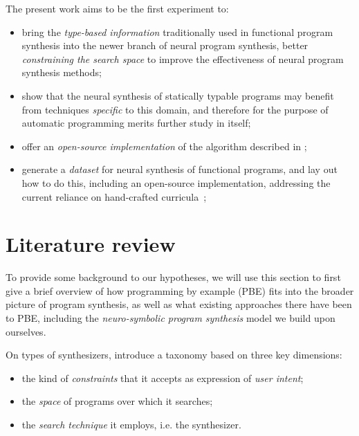\documentclass{article}
\begin{document}
The present work aims to be the first experiment to:
\begin{itemize}
    \item bring the \emph{type-based information} traditionally used in functional program synthesis into the newer branch of neural program synthesis,
    better \emph{constraining the search space} to improve the effectiveness of neural program synthesis methods;
    \item show that the neural synthesis of statically typable programs may benefit from techniques \emph{specific} to this domain, and therefore for the purpose of automatic programming merits further study in itself;
    \item offer an \emph{open-source implementation} of the algorithm described in \citet{nsps};
    \item generate a \emph{dataset} for neural synthesis of functional programs, and lay out how to do this, including an open-source implementation, addressing the current reliance on hand-crafted curricula~\citep{nps};
\end{itemize}


\section{Literature review} \label{sec:litreview}

To provide some background to our hypotheses,
we will use this section to first give a brief overview of how programming by example (PBE) fits into the broader picture of program synthesis,
as well as what existing approaches there have been to PBE,
including the \emph{neuro-symbolic program synthesis} model we build upon ourselves.

On types of synthesizers,
\citet{gulwani2017program} introduce a taxonomy based on three key dimensions:
\begin{itemize}
    \item the kind of \emph{constraints} that it accepts as expression of \emph{user intent};
    \item the \emph{space} of programs over which it searches;
    \item the \emph{search technique} it employs, i.e. the synthesizer.
\end{itemize}
\end{document}
